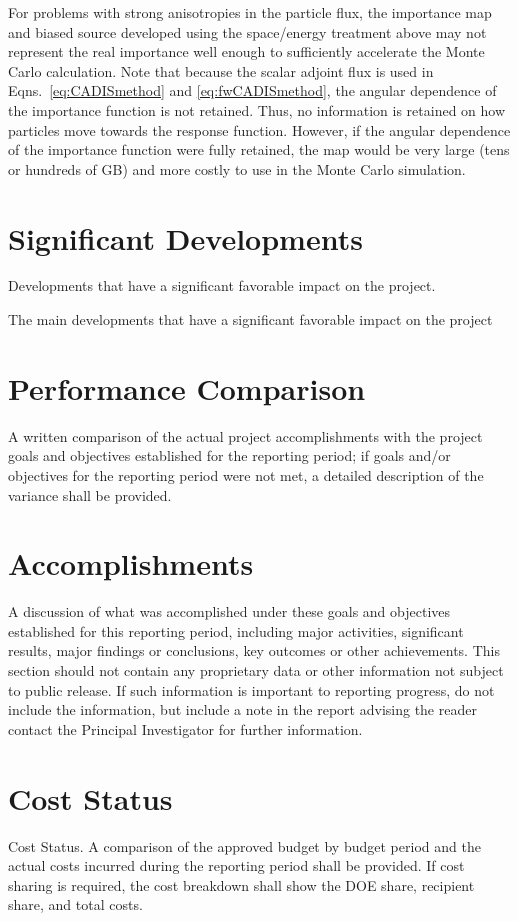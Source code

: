 \documentclass[12pt]{article}
\begin{document}
For problems with strong anisotropies in the particle flux, the importance map and biased source developed using the space/energy treatment above may not represent the real importance well enough to sufficiently accelerate the Monte Carlo calculation. Note that because the scalar adjoint flux is used in Eqns.~\eqref{eq:CADISmethod} and \eqref{eq:fwCADISmethod}, the angular dependence of the importance function is not retained. Thus, no information is retained on how particles move towards the response function. However, if the angular dependence of the importance function were fully retained, the map would be very large (tens or hundreds of GB) and more costly to use in the Monte Carlo simulation. 


\section{Significant Developments}
\label{sect::sig-devel}
Developments that have a significant favorable impact on the project.

The main developments that have a significant favorable impact on the project 

\section{Performance Comparison}
\label{sect::perf-comp} 
A written comparison of the actual project accomplishments with the project goals and objectives established for the reporting period; if goals and/or objectives for the reporting period were not met, a detailed description of the variance shall be provided. 

\section{Accomplishments}
\label{sect::accomplishments}
A discussion of what was accomplished under these goals and objectives established for this reporting period, including major activities, significant results, major findings or conclusions, key outcomes or other achievements.  This section should not contain any proprietary data or other information not subject to public release.  If such information is important to reporting progress, do not include the information, but include a note in the report advising the reader contact the Principal Investigator for further information. 

\section{Cost Status}
\label{sect::cost}
Cost Status.  A comparison of the approved budget by budget period and the actual costs incurred during the reporting period shall be provided.  If cost sharing is required, the cost breakdown shall show the DOE share, recipient share, and total costs. 
\end{document}
